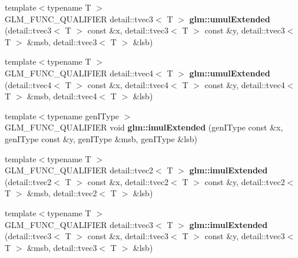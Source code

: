 \begin{DoxyCompactItemize}
\item 
\hypertarget{namespaceglm_a0b3d52bde31bea183a58c5474e894d82}{{\footnotesize template$<$typename T $>$ }\\\-G\-L\-M\-\_\-\-F\-U\-N\-C\-\_\-\-Q\-U\-A\-L\-I\-F\-I\-E\-R \*
detail\-::tvec3$<$ \-T $>$ {\bfseries glm\-::umul\-Extended} (detail\-::tvec3$<$ \-T $>$ const \&x, detail\-::tvec3$<$ \-T $>$ const \&y, detail\-::tvec3$<$ \-T $>$ \&msb, detail\-::tvec3$<$ \-T $>$ \&lsb)}\label{namespaceglm_a0b3d52bde31bea183a58c5474e894d82}

\item 
\hypertarget{namespaceglm_a0516c3b14eb0df2ce7002e04de45f0a1}{{\footnotesize template$<$typename T $>$ }\\\-G\-L\-M\-\_\-\-F\-U\-N\-C\-\_\-\-Q\-U\-A\-L\-I\-F\-I\-E\-R \*
detail\-::tvec4$<$ \-T $>$ {\bfseries glm\-::umul\-Extended} (detail\-::tvec4$<$ \-T $>$ const \&x, detail\-::tvec4$<$ \-T $>$ const \&y, detail\-::tvec4$<$ \-T $>$ \&msb, detail\-::tvec4$<$ \-T $>$ \&lsb)}\label{namespaceglm_a0516c3b14eb0df2ce7002e04de45f0a1}

\item 
\hypertarget{namespaceglm_a82759e0610bf3ebf95fdf69b94ab6f23}{{\footnotesize template$<$typename gen\-I\-Type $>$ }\\\-G\-L\-M\-\_\-\-F\-U\-N\-C\-\_\-\-Q\-U\-A\-L\-I\-F\-I\-E\-R void {\bfseries glm\-::imul\-Extended} (gen\-I\-Type const \&x, gen\-I\-Type const \&y, gen\-I\-Type \&msb, gen\-I\-Type \&lsb)}\label{namespaceglm_a82759e0610bf3ebf95fdf69b94ab6f23}

\item 
\hypertarget{namespaceglm_a040e40acaab0ca3e99f14ca99f83c9b5}{{\footnotesize template$<$typename T $>$ }\\\-G\-L\-M\-\_\-\-F\-U\-N\-C\-\_\-\-Q\-U\-A\-L\-I\-F\-I\-E\-R \*
detail\-::tvec2$<$ \-T $>$ {\bfseries glm\-::imul\-Extended} (detail\-::tvec2$<$ \-T $>$ const \&x, detail\-::tvec2$<$ \-T $>$ const \&y, detail\-::tvec2$<$ \-T $>$ \&msb, detail\-::tvec2$<$ \-T $>$ \&lsb)}\label{namespaceglm_a040e40acaab0ca3e99f14ca99f83c9b5}

\item 
\hypertarget{namespaceglm_a66babe617fc3264888469469d6e2dede}{{\footnotesize template$<$typename T $>$ }\\\-G\-L\-M\-\_\-\-F\-U\-N\-C\-\_\-\-Q\-U\-A\-L\-I\-F\-I\-E\-R \*
detail\-::tvec3$<$ \-T $>$ {\bfseries glm\-::imul\-Extended} (detail\-::tvec3$<$ \-T $>$ const \&x, detail\-::tvec3$<$ \-T $>$ const \&y, detail\-::tvec3$<$ \-T $>$ \&msb, detail\-::tvec3$<$ \-T $>$ \&lsb)}\label{namespaceglm_a66babe617fc3264888469469d6e2dede}


\end{DoxyCompactItemize}
